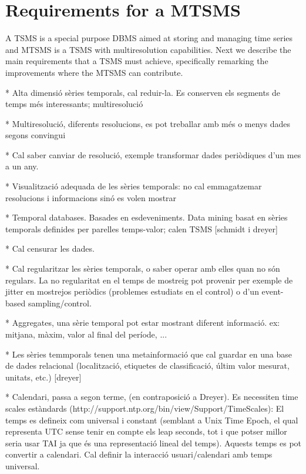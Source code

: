 \section{Requirements for a MTSMS}

A TSMS is a special purpose DBMS aimed at storing and managing time
series and MTSMS is a TSMS with multiresolution capabilities. Next we
describe the main requirements that a TSMS must achieve, specifically
remarking the improvements where the MTSMS can contribute.



* Alta dimensió sèries temporals, cal reduir-la. Es conserven els segments de temps més interessants; multiresolució


* Multiresolució, diferents resolucions, es pot treballar amb més o menys dades segons convingui

* Cal saber canviar de resolució, exemple transformar dades periòdiques d'un mes a un any.

* Visualització adequada de les sèries temporals: no cal emmagatzemar resolucions i informacions sinó es volen mostrar


* Temporal databases. Basades en esdeveniments. Data mining basat en sèries temporals definides per parelles temps-valor; calen TSMS [schmidt i dreyer] 



* Cal censurar les dades.

* Cal regularitzar les sèries temporals, o saber operar amb elles quan no són regulars. La no regularitat en el temps de mostreig pot provenir per exemple de jitter en mostrejos periòdics (problemes estudiats en el control) o d'un event-based sampling/control.


* Aggregates, una sèrie temporal pot estar mostrant diferent informació. ex: mitjana, màxim, valor al final del període, ...

* Les sèries temmporals tenen una metainformació que cal guardar en una base de dades relacional (localització, etiquetes de classificació, últim valor mesurat, unitats, etc.) [dreyer]



* Calendari, passa a segon terme, (en contraposició a Dreyer). Es necessiten time scales estàndards (http://support.ntp.org/bin/view/Support/TimeScales): El temps es defineix com universal i constant (semblant a Unix Time Epoch, el qual representa UTC sense tenir en compte els leap seconds, tot i que potser millor seria usar TAI ja que és una representació lineal del temps). Aquests temps es pot convertir a calendari. Cal definir la interacció usuari/calendari amb temps universal.


